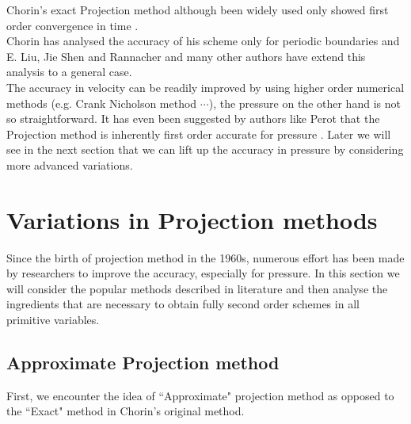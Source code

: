 Chorin's exact Projection method although been widely used only showed first order convergence in time  \cite{chorin1968numerical,brown2001accurate,shen1992error,rannacher1992chorin}.\\
Chorin has analysed the accuracy of his scheme only for periodic boundaries \cite{chorin1969convergence} and E. Liu, Jie Shen and Rannacher \cite{liu1996projection,shen1992error,rannacher1992chorin}and many other authors have extend this analysis to a general case.\\

The accuracy in velocity can be readily improved by using higher order numerical methods (e.g. Crank Nicholson method $\cdots$), the pressure on the other hand is not so straightforward. It has even been suggested by authors like Perot that the Projection method is inherently first order accurate for pressure \cite{perot1993analysis}. Later we will see in the next section that we can lift up the accuracy in pressure by considering more advanced variations.

\newpage
\section{Variations in Projection methods}
Since the birth of projection method in the 1960s, numerous effort has been made by researchers to improve the accuracy, especially for pressure. In this section we will consider the popular methods described in literature and then analyse the  ingredients that are necessary to obtain fully second order schemes in all primitive variables.

\subsection{Approximate Projection method}
First, we encounter the idea of ``Approximate" projection method as opposed to the ``Exact" method in Chorin's original method.\\

